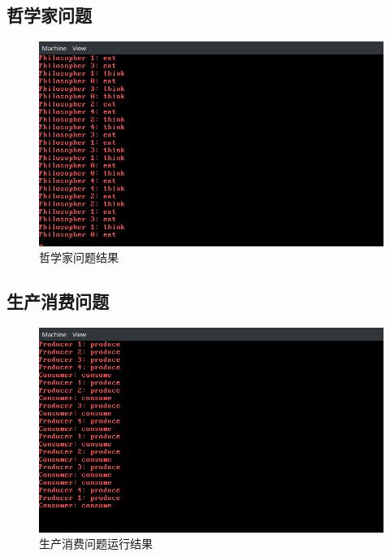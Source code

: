\documentclass[12pt,a4paper,UTF8]{article}
\begin{document}
\subsection{哲学家问题}
\begin{figure}[htbp]
	\centering
	\includegraphics[width=\textwidth]{philosopher}
	\caption{哲学家问题结果}
\end{figure}

\newpage
\subsection{生产消费问题}
\begin{figure}[htbp]
	\centering
	\includegraphics[width=\textwidth]{producer}
	\caption{生产消费问题运行结果}
\end{figure}

\newpage
\end{document}

